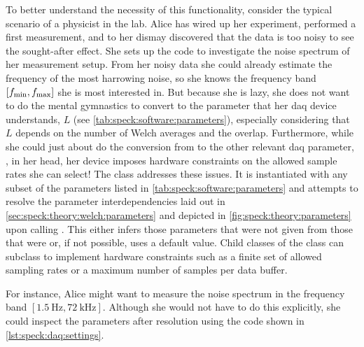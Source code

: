 To better understand the necessity of this functionality, consider the typical scenario of a physicist
in the lab.
Alice has wired up her experiment, performed a first measurement, and to her dismay discovered that the data is too noisy to see the sought-after effect.
She sets up the \pyspeck code to investigate the noise spectrum of her measurement setup.
From her noisy data she could already estimate the frequency of the most harrowing noise, so she knows the frequency band $[f_{\mathrm{min}}, f_{\mathrm{max}}]$ she is most interested in.
But because she is lazy, she does not want to do the mental gymnastics to convert \fmin to the parameter that her \gls{daq} device understands, $L$ (see \cref{tab:speck:software:parameters}), especially considering that $L$ depends on the number of Welch averages and the overlap.
Furthermore, while she could just about do the conversion from \fmax to the other relevant \gls{daq} parameter, \fs, in her head, her device imposes hardware constraints on the allowed sample rates she can select!
The  class addresses these issues.
It is instantiated with any subset of the parameters listed in \cref{tab:speck:software:parameters}
and attempts to resolve the parameter interdependencies laid out in \cref{sec:speck:theory:welch:parameters} and depicted in \cref{fig:speck:theory:parameters} upon calling .
This either infers those parameters that were not given from those that were or, if not possible, uses a default value.
Child classes of the  class can subclass  to implement hardware constraints such as a finite set of allowed sampling rates or a maximum number of samples per data buffer.

For instance, Alice might want to measure the noise spectrum in the frequency band $[\qty{1.5}{\hertz}, \qty{72}{\kilo\hertz}]$.
Although she would not have to do this explicitly,
she could inspect the parameters after resolution using the code shown in \cref{lst:speck:daq:settings}.

